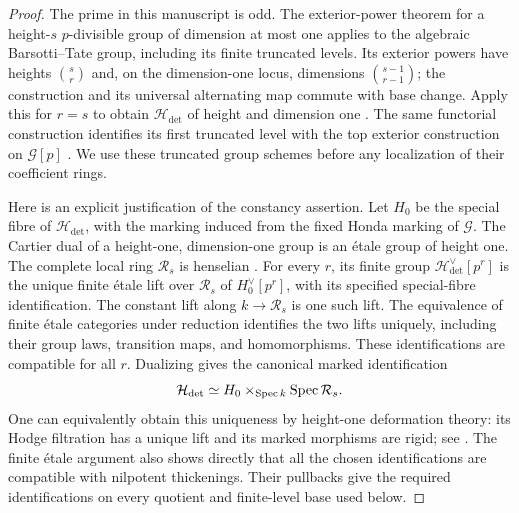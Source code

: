 \begin{proof}
The prime in this manuscript is odd.  The exterior-power theorem for
a height-$s$ $p$-divisible group of dimension at most one applies to
the algebraic Barsotti--Tate group, including its finite truncated
levels.  Its exterior powers have heights $\binom{s}{r}$ and, on
the dimension-one locus, dimensions $\binom{s-1}{r-1}$; the
construction and its universal alternating map commute with base
change.  Apply this for $r=s$ to obtain $\mathcal H_{\det}$ of
height and dimension one
\cite[Theorem~3.25]{HedayatzadehExterior}.  The same functorial
construction identifies its first truncated level with the top
exterior construction on $\mathcal G[p]$
\cite[Lemmas~3.23--3.24 and Theorem~3.25]{HedayatzadehExterior}.
We use these truncated
group schemes before any localization of their coefficient rings.

Here is an explicit justification of the constancy assertion.
Let $H_0$ be the special fibre of $\mathcal H_{\det}$, with the
marking induced from the fixed Honda marking of $\mathcal G$.
The Cartier dual of a height-one, dimension-one group is an
\'{e}tale group of height one.  The complete local ring
$\mathcal R_s$ is henselian
\cite[Lemma~10.153.9, Tag~04GM]{StacksProject}.
For every $r$, its finite group
$\mathcal H_{\det}^{\vee}[p^r]$ is the unique finite \'{e}tale
lift over $\mathcal R_s$ of
$H_0^{\vee}[p^r]$, with its specified special-fibre identification.
The constant lift along $k\to\mathcal R_s$ is one such lift.
The equivalence of finite \'{e}tale categories under reduction
\cite[Lemma~10.153.7, Tag~04GK]{StacksProject}
identifies the two
lifts uniquely, including their group laws, transition maps, and
homomorphisms.  These identifications are compatible for all $r$.
Dualizing gives the canonical marked identification
\[
          \mathcal H_{\det}\simeq
                   H_0\times_{\operatorname{Spec} k}\operatorname{Spec}\mathcal R_s.
\]
One can equivalently obtain this uniqueness by height-one deformation
theory: its Hodge filtration has a unique lift and its marked
morphisms are rigid; see \cite[Theorem~48, Proposition~40,
and Corollary~95]{ZinkDisplays}.  The finite \'{e}tale argument also
shows directly that all the chosen identifications are compatible
with nilpotent thickenings.  Their pullbacks give the required
identifications on every quotient and finite-level base used below.


\end{proof}
